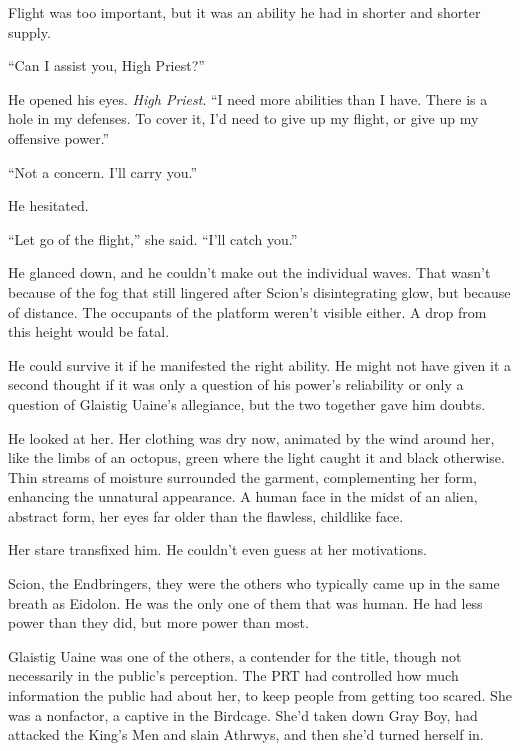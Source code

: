 Flight was too important, but it was an ability he had in shorter and shorter supply.



``Can I assist you, High Priest?''



He opened his eyes. \emph{ High Priest}.  ``I need more abilities than I have.  There is a hole in my defenses.  To cover it, I'd need to give up my flight, or give up my offensive power.''



``Not a concern.  I'll carry you.''



He hesitated.



``Let go of the flight,'' she said.  ``I'll catch you.''



He glanced down, and he couldn't make out the individual waves.  That wasn't because of the fog that still lingered after Scion's disintegrating glow, but because of distance.  The occupants of the platform weren't visible either.  A drop from this height would be fatal.



He could survive it if he manifested the right ability.  He might not have given it a second thought if it was only a question of his power's reliability or only a question of Glaistig Uaine's allegiance, but the two together gave him doubts.



He looked at her.  Her clothing was dry now, animated by the wind around her, like the limbs of an octopus, green where the light caught it and black otherwise.  Thin streams of moisture surrounded the garment, complementing her form, enhancing the unnatural appearance.  A human face in the midst of an alien, abstract form, her eyes far older than the flawless, childlike face.



Her stare transfixed him.  He couldn't even guess at her motivations.



Scion, the Endbringers, they were the others who typically came up in the same breath as Eidolon.  He was the only one of them that was human.  He had less power than they did, but more power than most.



Glaistig Uaine was one of the others, a contender for the title, though not necessarily in the public's perception.  The PRT had controlled how much information the public had about her, to keep people from getting too scared.  She was a nonfactor, a captive in the Birdcage.  She'd taken down Gray Boy, had attacked the King's Men and slain Athrwys, and then she'd turned herself in.



